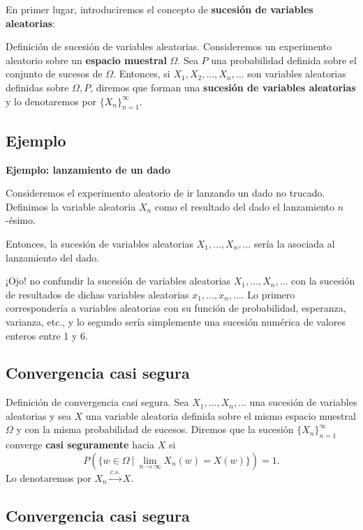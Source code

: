 \documentclass[]{book}
\begin{document}
En primer lugar, introduciremos el concepto de \textbf{sucesión de variables aleatorias}:

 Definición de sucesión de variables aleatorias.
Consideremos un experimento aleatorio sobre un \textbf{espacio muestral} \(\Omega\). Sea \(P\) una probabilidad definida sobre el conjunto de sucesos de \(\Omega\). Entonces, si \(X_1,X_2,\ldots,X_n,\ldots\) son variables aleatorias definidas sobre \(\Omega,P\), diremos que forman una \textbf{sucesión de variables aleatorias} y lo denotaremos por \(\{X_n\}_{n=1}^\infty\).

\hypertarget{ejemplo-135}{%
\subsection{Ejemplo}\label{ejemplo-135}}

\textbf{Ejemplo: lanzamiento de un dado}

Consideremos el experimento aleatorio de ir lanzando un dado no trucado. Definimos la variable aleatoria \(X_n\) como el resultado del dado el lanzamiento \(n\)-ésimo.

Entonces, la sucesión de variables aleatorias \(X_1,\ldots,X_n,\ldots\) sería la asociada al lanzamiento del dado.

¡Ojo! no confundir la sucesión de variables aleatorias \(X_1,\ldots,X_n,\ldots\) con la sucesión de resultados de dichas variables aleatorias \(x_1,\ldots, x_n,\ldots\). Lo primero correspondería a variables aleatorias con su función de probabilidad, esperanza, varianza, etc., y lo segundo sería simplemente una sucesión numérica de valores enteros entre 1 y 6.

\hypertarget{convergencia-casi-segura}{%
\subsection{Convergencia casi segura}\label{convergencia-casi-segura}}

 Definición de convergencia casi segura.
Sea \(X_1,\ldots,X_n,\ldots\) una sucesión de variables aleatorias y sea \(X\) una variable aleatoria definida sobre el mismo espacio muestral \(\Omega\) y con la misma probabilidad de sucesos. Diremos que la sucesión \(\{X_n\}_{n=1}^\infty\) converge \textbf{casi seguramente} hacia \(X\) si
\[
P(\{w\in \Omega\ |\ \lim_{n\to\infty} X_n(w)=X(w)\})=1.
\]
Lo denotaremos por \(X_n\stackrel{c.s.}{\longrightarrow}X\).

\hypertarget{convergencia-casi-segura-1}{%
\subsection{Convergencia casi segura}\label{convergencia-casi-segura-1}}
\end{document}
